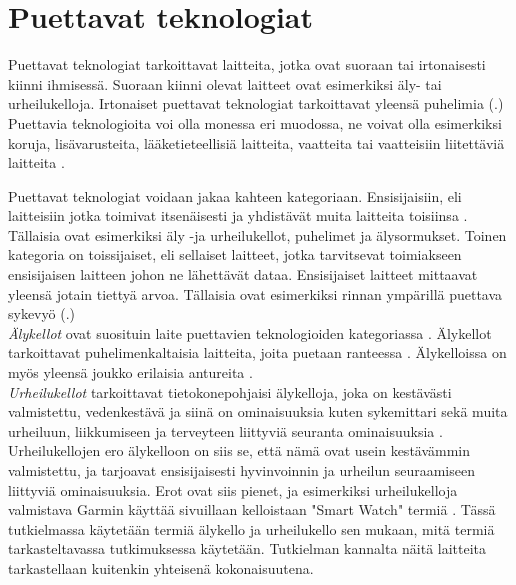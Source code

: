\documentclass[utf8,bachelor,finnish]{bachelor}
\begin{document}
   
\chapter{Puettavat teknologiat}

  Puettavat teknologiat tarkoittavat laitteita, jotka ovat suoraan tai irtonaisesti
   kiinni ihmisessä. Suoraan kiinni olevat laitteet ovat esimerkiksi äly- tai urheilukelloja.
    Irtonaiset puettavat teknologiat tarkoittavat yleensä puhelimia (\cite{godfrey2018z}.) Puettavia teknologioita voi olla
     monessa eri muodossa, ne voivat olla esimerkiksi koruja, lisävarusteita, lääketieteellisiä laitteita, vaatteita tai
      vaatteisiin liitettäviä laitteita \parencite{Yasar_what_wearable}.
    
  Puettavat teknologiat voidaan jakaa kahteen kategoriaan. Ensisijaisiin, eli laitteisiin jotka toimivat itsenäisesti
   ja yhdistävät muita laitteita toisiinsa \parencite{godfrey2018z}. Tällaisia ovat esimerkiksi äly -ja urheilukellot, puhelimet ja älysormukset.
    Toinen kategoria on toissijaiset, eli sellaiset laitteet, jotka tarvitsevat toimiakseen ensisijaisen laitteen johon ne lähettävät dataa. 
     Ensisijaiset laitteet mittaavat yleensä jotain tiettyä arvoa. Tällaisia ovat esimerkiksi rinnan ympärillä puettava sykevyö (\cite{godfrey2018z}.) \\

  \emph{Älykellot} ovat suosituin laite puettavien teknologioiden kategoriassa \parencite{godfrey2018z}.
   Älykellot tarkoittavat puhelimenkaltaisia laitteita, joita puetaan ranteessa \parencite{Gregersen_watch_2023}.
    Älykelloissa on myös yleensä joukko erilaisia antureita \parencite{rawassizadeh_wearables_2014}.\\

  \emph{Urheilukellot} tarkoittavat tietokonepohjaisi älykelloja, joka on kestävästi valmistettu, vedenkestävä ja siinä on ominaisuuksia kuten
    sykemittari sekä muita urheiluun, liikkumiseen ja terveyteen liittyviä seuranta ominaisuuksia \parencite{sportswatch_tfd}. Urheilukellojen ero älykelloon on siis se,
     että nämä ovat usein kestävämmin valmistettu, ja tarjoavat ensisijaisesti hyvinvoinnin ja urheilun seuraamiseen liittyviä ominaisuuksia. Erot ovat siis pienet, 
      ja esimerkiksi urheilukelloja valmistava Garmin käyttää sivuillaan kelloistaan "Smart Watch" termiä \parencite{garmin_site}. Tässä tutkielmassa
       käytetään termiä älykello ja urheilukello sen mukaan, mitä termiä tarkasteltavassa tutkimuksessa käytetään. Tutkielman kannalta näitä laitteita tarkastellaan kuitenkin
        yhteisenä kokonaisuutena.\\
  
\end{document}

